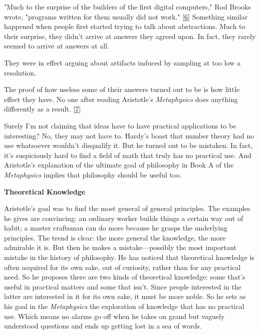 "Much
                  to the surprise of the builders of the first digital
                  computers," Rod Brooks wrote, "programs written for them
                  usually did not work."
                  [\href{\#f6n}{6}]
                  Something similar happened when people first started trying to
                  talk about abstractions. Much to their surprise, they didn't
                  arrive at answers they agreed upon. In fact, they rarely
                  seemed to arrive at answers at all.

They were in
                  effect arguing about artifacts induced by sampling at too low
                  a resolution.

The proof of how useless some of
                  their answers turned out to be is how little effect they have.
                  No one after reading Aristotle's \emph{Metaphysics} does
                  anything differently as a result.
                  [\href{\#f7n}{7}]

Surely I'm not claiming that ideas have to have
                  practical applications to be interesting? No, they may not
                  have to. Hardy's boast that number theory had no use
                  whatsoever wouldn't disqualify it. But he turned out to be
                  mistaken. In fact, it's suspiciously hard to find a field of
                  math that truly has no practical use. And Aristotle's
                  explanation of the ultimate goal of philosophy in Book A of
                  the \emph{Metaphysics} implies that philosophy should be
                  useful too.

\textbf{Theoretical Knowledge}

Aristotle's goal was to find the most general of
                  general principles. The examples he gives are convincing: an
                  ordinary worker builds things a certain way out of habit; a
                  master craftsman can do more because he grasps the underlying
                  principles. The trend is clear: the more general the
                  knowledge, the more admirable it is. But then he makes a
                  mistake---possibly the most important mistake in the
                  history of philosophy. He has noticed that theoretical
                  knowledge is often acquired for its own sake, out of
                  curiosity, rather than for any practical need. So he proposes
                  there are two kinds of theoretical knowledge: some that's
                  useful in practical matters and some that isn't. Since people
                  interested in the latter are interested in it for its own
                  sake, it must be more noble. So he sets as his goal in the
                  \emph{Metaphysics} the exploration of knowledge that has no
                  practical use. Which means no alarms go off when he takes on
                  grand but vaguely understood questions and ends up getting
                  lost in a sea of words.

